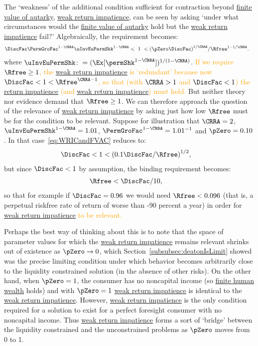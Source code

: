 \documentclass[BufferStockTheory]{subfiles}
\begin{document}
\renewcommand{\figName}{Inequalities} 
\renewcommand{\figFile}{\figName} 
\hypertarget{\figFile}{}

The `weakness' of the additional condition sufficient for contraction beyond \hyperlink{FVAC}{finite value of autarky}, \hyperlink{WRIC}{weak return impatience}, can be seen by asking `under what circumstances would the \hyperlink{FVAC}{finite value of autarky} hold but the \hyperlink{WRIC}{weak return impatience} fail?'  Algebraically, the requirement becomes:
%
\begin{align}
  \DiscFac \PermGroFac^{1-\CRRA}\uInvEuPermShk^{1-\CRRA} & < ~ 1 ~ <  {(\pZero \DiscFac)}^{1/\CRRA}/\Rfree^{1-1/\CRRA}. \label{eq:WRICandFVAC}
\end{align}
%
where $\uInvEuPermShk \colon = (\Ex[\permShk^{1-\CRRA}])^{1/(1-\CRRA)}$. \textcolor{orange}{If we require $\Rfree \geq 1$, the \hyperlink{WRIC}{weak return impatience} is `redundant' because now $\DiscFac <1<\Rfree^{\CRRA-1}$, so that (with $\CRRA > 1$ and $\DiscFac<1$) the \hyperlink{RIC}{return impatience} (and \hyperlink{WRIC}{weak return impatience}) must hold.}  But neither theory nor evidence demand that $\Rfree \geq 1$.  We can therefore approach the question of the relevance of \hyperlink{WRIC}{weak return impatience}  by asking just how low $\Rfree$ must be for the condition to be relevant.  Suppose for illustration that $\CRRA=2$, $\uInvEuPermShk^{1-\CRRA}=1.01$, $\PermGroFac^{1-\CRRA}=1.01^{-1}$ and $\pZero = 0.10$.  In that case~\eqref{eq:WRICandFVAC} reduces to:
\begin{align*}
  \DiscFac  & < 1 < {(0.1 \DiscFac/\Rfree)}^{1/2},
\end{align*}
but since $\DiscFac < 1$ by assumption, the binding requirement becomes:
\begin{align*}
  \Rfree  & < \DiscFac/10, \notag
\end{align*}
so that for example if $\DiscFac=0.96$ we would need $\Rfree < 0.096$ (that is, a perpetual riskfree rate of return of worse than -90 percent a year) in order for  \hyperlink{WRIC}{weak return impatience} \textcolor{orange}{to be relevant.} 


Perhaps the best way of thinking about this is to note that the space of parameter values for which the \hyperlink{WRIC}{weak return impatience}  remains relevant shrinks out of existence as $\pZero \rightarrow 0$, which Section~\ref{subsubsec:deatonIsLimit} showed was the precise limiting condition under which behavior becomes arbitrarily close to the liquidity constrained solution (in the absence of other risks).  On the other hand, when $\pZero = 1$, the consumer has no noncapital income (so \hyperlink{FHWC}{finite human wealth} holds) and with $\pZero=1$ \hyperlink{WRIC}{weak return impatience} is identical to the \hyperlink{WRIC}{weak return impatience}. However, \hyperlink{WRIC}{weak return impatience} is the only condition required for a solution to exist for a perfect foresight consumer with no noncapital income.  Thus \hyperlink{WRIC}{weak return impatience} forms a sort of `bridge' between the liquidity constrained and the unconstrained problems as $\pZero$ moves from 0 to 1.
\end{document}

